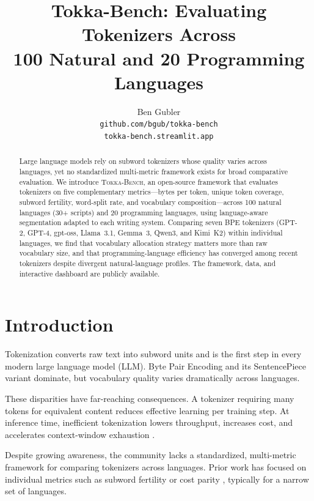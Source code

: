 \documentclass[11pt]{article}
\title{Tokka-Bench: Evaluating Tokenizers Across\\100 Natural and 20 Programming Languages}
\author{Ben Gubler \\
  \texttt{github.com/bgub/tokka-bench} \\
  \texttt{tokka-bench.streamlit.app}}
\begin{document}
\maketitle

\begin{abstract}
Large language models rely on subword tokenizers whose quality varies across languages, yet no standardized multi-metric framework exists for broad comparative evaluation.
We introduce \textsc{Tokka-Bench}, an open-source framework that evaluates tokenizers on five complementary metrics---bytes per token, unique token coverage, subword fertility, word-split rate, and vocabulary composition---across 100 natural languages (30+ scripts) and 20 programming languages, using language-aware segmentation adapted to each writing system.
Comparing seven BPE tokenizers (GPT-2, GPT-4, gpt-oss, Llama~3.1, Gemma~3, Qwen3, and Kimi~K2) within individual languages, we find that vocabulary allocation strategy matters more than raw vocabulary size, and that programming-language efficiency has converged among recent tokenizers despite divergent natural-language profiles.
The framework, data, and interactive dashboard are publicly available.
\end{abstract}

\section{Introduction}

Tokenization converts raw text into subword units and is the first step in every modern large language model (LLM).
Byte Pair Encoding \citep{sennrich2016bpe} and its SentencePiece variant \citep{kudo2018sentencepiece} dominate, but vocabulary quality varies dramatically across languages.

These disparities have far-reaching consequences.
A tokenizer requiring many tokens for equivalent content reduces effective learning per training step.
At inference time, inefficient tokenization lowers throughput, increases cost, and accelerates context-window exhaustion \citep{ahia2023all,petrov2023language}.

Despite growing awareness, the community lacks a standardized, multi-metric framework for comparing tokenizers across languages.
Prior work has focused on individual metrics such as subword fertility \citep{acs2019bert,rust2021good} or cost parity \citep{ahia2023all}, typically for a narrow set of languages.
\end{document}
